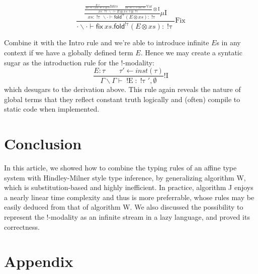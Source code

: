 \documentclass{article}
\newcommand{\bang}[1]{\operatorname{! #1}}
\newcommand{\inst}[1]{\mathit{inst}(#1)}
\newcommand{\fold}[2]{\textsf{fold}^{#1} #2}
\newcommand{\fix}[2]{\textsf{fix} ~ #1. #2}
\begin{document}
\begin{displaymath}
  \displaystyle \frac 
    { \displaystyle \frac 
        { \displaystyle \frac 
            { \displaystyle \frac 
                {E : \tau} 
                {xs : \bang \tau \backslash xs : \bang \tau \vdash E : \tau}
              \mathrm{Intro}
              \qquad
              \displaystyle \frac 
                {} 
                {xs : \bang \tau \backslash \cdot \vdash xs : \bang \tau}
              \mathrm{Var}
            }
            {xs : \bang \tau \backslash \cdot \vdash E \otimes xs : \tau \otimes \bang \tau} 
          \otimes \mathrm{I}
        }
        {xs : \bang \tau \backslash \cdot \vdash \fold{\bang \tau}{(E \otimes xs)} : \bang \tau} 
      \mu \mathrm{I}
    }
    {\cdot \backslash \cdot \vdash \fix{xs}{\fold{\bang \tau}{(E \otimes xs)}} : \bang \tau} 
  \mathrm{Fix}
\end{displaymath}

Combine it with the $\mathrm{Intro}$ rule and we're able to introduce infinite $E$s in any context if we have a globally defined term $E$. Hence we may create a syntatic sugar as the introduction rule for the !-modality:
\begin{displaymath}
  \frac
    {E : \tau \qquad  \tau' \leftarrow \inst{\tau}}
    {\Gamma \backslash \Gamma \vdash \bang E : \bang \tau', \emptyset}
    !\mathrm{I}
\end{displaymath}
which desugars to the derivation above. This rule again reveals the nature of global terms that they reflect constant truth logically and (often) compile to static code when implemented.

\section{Conclusion}

In this article, we showed how to combine the typing rules of an affine type system with Hindley-Milner style type inference, by generalizing algorithm W, which is substitution-based and highly inefficient. In practice, algorithm J enjoys a nearly linear time complexity and thus is more preferrable, whose rules may be easily deduced from that of algorithm W. We also discussed the possibility to represent the !-modality as an infinite stream in a lazy language, and proved its correctness.

\section*{Appendix}
\end{document}
